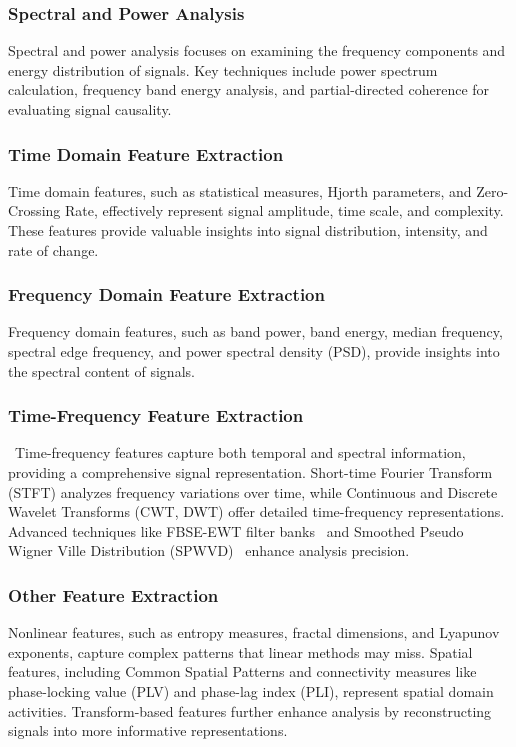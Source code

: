 \subsubsection{Spectral and Power Analysis}
Spectral and power analysis focuses on examining the frequency components and energy distribution of signals.
Key techniques include power spectrum calculation, frequency band energy analysis, and partial-directed coherence for evaluating signal causality.

\subsubsection{Time Domain Feature Extraction}
Time domain features, such as statistical measures, Hjorth parameters, and Zero-Crossing Rate, effectively represent signal amplitude, time scale, and complexity. These features provide valuable insights into signal distribution, intensity, and rate of change.

\subsubsection{Frequency Domain Feature Extraction}
Frequency domain features, such as band power, band energy, median frequency, spectral edge frequency, and power spectral density (PSD), provide insights into the spectral content of signals.

\subsubsection{Time-Frequency Feature Extraction}\
Time-frequency features capture both temporal and spectral information, providing a comprehensive signal representation.
Short-time Fourier Transform (STFT) analyzes frequency variations over time, while Continuous and Discrete Wavelet Transforms (CWT, DWT) offer detailed time-frequency representations.
Advanced techniques like FBSE-EWT filter banks~\cite{9096344} and Smoothed Pseudo Wigner Ville Distribution (SPWVD)~\cite{Ebrahimzadeh2013ANA} enhance analysis precision.

\subsubsection{Other Feature Extraction}
Nonlinear features, such as entropy measures, fractal dimensions, and Lyapunov exponents, capture complex patterns that linear methods may miss. Spatial features, including Common Spatial Patterns and connectivity measures like phase-locking value (PLV) and phase-lag index (PLI), represent spatial domain activities. 
Transform-based features further enhance analysis by reconstructing signals into more informative representations.

